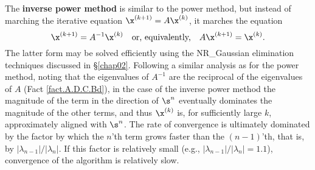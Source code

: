 The {\bf inverse power method} is similar to the power method, but instead of marching the iterative equation $\x^{(k+1)}=A\x^{(k)}$, it marches the equation
\begin{equation}
\x^{(k+1)}=A^{-1}\x^{(k)} \quad \textrm{or, equivalently,} \quad A\x^{(k+1)}=\x^{(k)}.\label{eq.inversepowermethod}
\end{equation}
The latter form may be solved efficiently using the NR_Gaussian elimination techniques discussed in \S \ref{chap02}.
Following a similar analysis as for the power method,
noting that the eigenvalues of $A^{-1}$ are the reciprocal of the eigenvalues of $A$ (Fact \ref{fact.A.D.C.Bd}),
in the case of the inverse power method the magnitude of the term in the direction of $\s^n$
eventually dominates the magnitude of the other terms, and thus $\x^{(k)}$ is, for sufficiently large $k$, approximately aligned with $\s^n$.
The rate of convergence is ultimately dominated by the factor by which the 
$n$'th term grows faster than the $(n-1)$'th, that is, by $|\lambda_{n-1}|/|\lambda_{n}|$.
If this factor is relatively small (e.g., $|\lambda_{n-1}|/|\lambda_{n}|=1.1$), convergence of the algorithm is relatively slow.
\vskip0.1in

